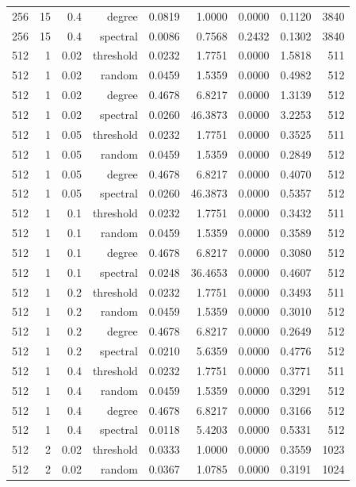 \begin{table}[t]
\begin{tabular}{lrrrrrrrr}
256 & 15 & 0.4 & degree & 0.0819 & 1.0000 & 0.0000 & 0.1120 & 3840 \\
256 & 15 & 0.4 & spectral & 0.0086 & 0.7568 & 0.2432 & 0.1302 & 3840 \\
512 & 1 & 0.02 & threshold & 0.0232 & 1.7751 & 0.0000 & 1.5818 & 511 \\
512 & 1 & 0.02 & random & 0.0459 & 1.5359 & 0.0000 & 0.4982 & 512 \\
512 & 1 & 0.02 & degree & 0.4678 & 6.8217 & 0.0000 & 1.3139 & 512 \\
512 & 1 & 0.02 & spectral & 0.0260 & 46.3873 & 0.0000 & 3.2253 & 512 \\
512 & 1 & 0.05 & threshold & 0.0232 & 1.7751 & 0.0000 & 0.3525 & 511 \\
512 & 1 & 0.05 & random & 0.0459 & 1.5359 & 0.0000 & 0.2849 & 512 \\
512 & 1 & 0.05 & degree & 0.4678 & 6.8217 & 0.0000 & 0.4070 & 512 \\
512 & 1 & 0.05 & spectral & 0.0260 & 46.3873 & 0.0000 & 0.5357 & 512 \\
512 & 1 & 0.1 & threshold & 0.0232 & 1.7751 & 0.0000 & 0.3432 & 511 \\
512 & 1 & 0.1 & random & 0.0459 & 1.5359 & 0.0000 & 0.3589 & 512 \\
512 & 1 & 0.1 & degree & 0.4678 & 6.8217 & 0.0000 & 0.3080 & 512 \\
512 & 1 & 0.1 & spectral & 0.0248 & 36.4653 & 0.0000 & 0.4607 & 512 \\
512 & 1 & 0.2 & threshold & 0.0232 & 1.7751 & 0.0000 & 0.3493 & 511 \\
512 & 1 & 0.2 & random & 0.0459 & 1.5359 & 0.0000 & 0.3010 & 512 \\
512 & 1 & 0.2 & degree & 0.4678 & 6.8217 & 0.0000 & 0.2649 & 512 \\
512 & 1 & 0.2 & spectral & 0.0210 & 5.6359 & 0.0000 & 0.4776 & 512 \\
512 & 1 & 0.4 & threshold & 0.0232 & 1.7751 & 0.0000 & 0.3771 & 511 \\
512 & 1 & 0.4 & random & 0.0459 & 1.5359 & 0.0000 & 0.3291 & 512 \\
512 & 1 & 0.4 & degree & 0.4678 & 6.8217 & 0.0000 & 0.3166 & 512 \\
512 & 1 & 0.4 & spectral & 0.0118 & 5.4203 & 0.0000 & 0.5331 & 512 \\
512 & 2 & 0.02 & threshold & 0.0333 & 1.0000 & 0.0000 & 0.3559 & 1023 \\
512 & 2 & 0.02 & random & 0.0367 & 1.0785 & 0.0000 & 0.3191 & 1024 \\

\end{tabular}
\end{table}
